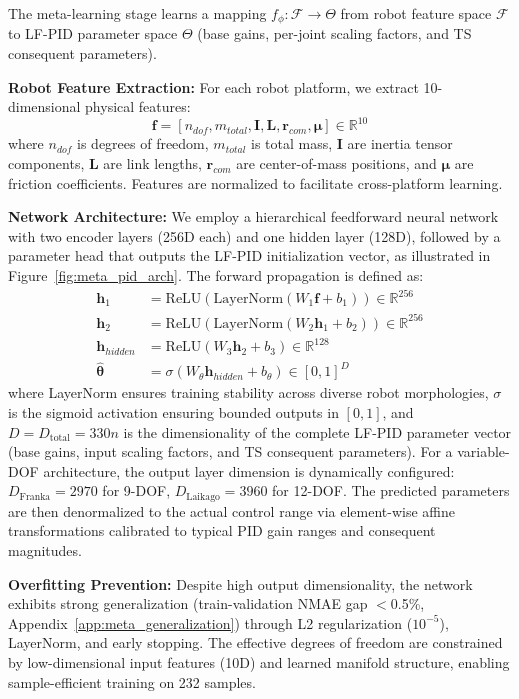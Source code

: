 \documentclass[a4paper]{cas-sc}
\begin{document}
The meta-learning stage learns a mapping $f_{\phi}: \mathcal{F} \rightarrow \Theta$ from robot feature space $\mathcal{F}$ to LF-PID parameter space $\Theta$ (base gains, per-joint scaling factors, and TS consequent parameters). 

\textbf{Robot Feature Extraction:} For each robot platform, we extract 10-dimensional physical features:
\begin{equation}
    \mathbf{f} = [n_{dof}, m_{total}, \mathbf{I}, \mathbf{L}, \mathbf{r}_{com}, \bm{\mu}] \in \mathbb{R}^{10}
\end{equation}
where $n_{dof}$ is degrees of freedom, $m_{total}$ is total mass, $\mathbf{I}$ are inertia tensor components, $\mathbf{L}$ are link lengths, $\mathbf{r}_{com}$ are center-of-mass positions, and $\bm{\mu}$ are friction coefficients. Features are normalized to facilitate cross-platform learning.

    \textbf{Network Architecture:} We employ a hierarchical feedforward neural network with two encoder layers (256D each) and one hidden layer (128D), followed by a parameter head that outputs the LF-PID initialization vector, as illustrated in Figure~\ref{fig:meta_pid_arch}. The forward propagation is defined as:
\begin{align}
    \mathbf{h}_1 &= \text{ReLU}(\text{LayerNorm}(W_1 \mathbf{f} + b_1)) \in \mathbb{R}^{256} \\
    \mathbf{h}_2 &= \text{ReLU}(\text{LayerNorm}(W_2 \mathbf{h}_1 + b_2)) \in \mathbb{R}^{256} \\
    \mathbf{h}_{hidden} &= \text{ReLU}(W_3 \mathbf{h}_2 + b_3) \in \mathbb{R}^{128} \\
    \hat{\bm{\theta}} &= \sigma(W_{\theta} \mathbf{h}_{hidden} + b_{\theta}) \in [0,1]^{D}
\end{align}
where LayerNorm ensures training stability across diverse robot morphologies, $\sigma$ is the sigmoid activation ensuring bounded outputs in $[0,1]$, and $D = D_{\text{total}} = 330n$ is the dimensionality of the complete LF-PID parameter vector (base gains, input scaling factors, and TS consequent parameters). For a variable-DOF architecture, the output layer dimension is dynamically configured: $D_{\text{Franka}} = 2970$ for 9-DOF, $D_{\text{Laikago}} = 3960$ for 12-DOF. The predicted parameters are then denormalized to the actual control range via element-wise affine transformations calibrated to typical PID gain ranges and consequent magnitudes.

\textbf{Overfitting Prevention:} Despite high output dimensionality, the network exhibits strong generalization (train-validation NMAE gap $<$0.5\%, Appendix~\ref{app:meta_generalization}) through L2 regularization ($10^{-5}$), LayerNorm, and early stopping. The effective degrees of freedom are constrained by low-dimensional input features (10D) and learned manifold structure, enabling sample-efficient training on 232 samples.
\end{document}
